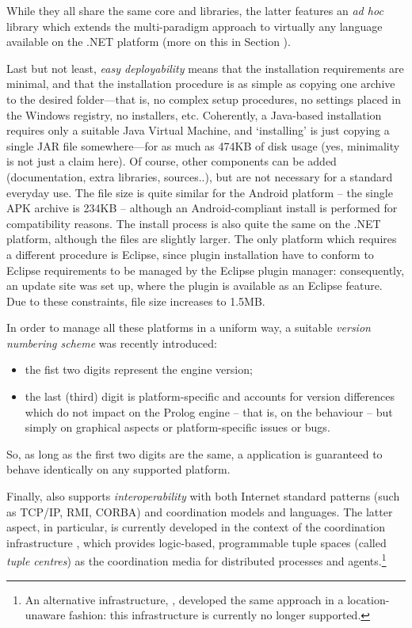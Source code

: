 While they all share the same core and libraries, the latter features an \emph{ad hoc} library which extends the multi-paradigm approach to virtually any language available on the .NET platform (more on this in Section ).

Last but not least, \textit{easy deployability} means that the installation requirements are minimal, and that the installation procedure is as simple as copying one archive to the desired folder---that is, no complex setup procedures, no settings placed in the Windows registry, no installers, etc.
%
Coherently, a Java-based installation requires only a suitable Java Virtual Machine, and `installing' is just copying a single JAR file somewhere---for as much as 474KB of disk usage (yes, minimality is not just a claim here).
%
Of course, other components can be added (documentation, extra libraries, sources..), but are not necessary for a standard everyday use.
%
The file size is quite similar for the Android platform -- the single APK archive is 234KB -- although an Android-compliant install is performed for compatibility reasons.
%
The install process is also quite the same on the .NET platform, although the files are slightly larger.
%
The only platform which requires a different procedure is Eclipse, since plugin installation have to conform to Eclipse requirements to be managed by the Eclipse plugin manager: consequently, an update site was set up, where the \tuprolog{} plugin is available as an Eclipse feature. Due to these constraints, file size increases to 1.5MB.

In order to manage all these platforms in a uniform way, a suitable \emph{version numbering scheme} was recently introduced:
\begin{itemize}
  \item the fist two digits represent the engine version;
  \item the last (third) digit is platform-specific and accounts for version differences which do not impact on the Prolog engine -- that is, on the
      \tuprolog{} behaviour -- but simply on graphical aspects or platform-specific
      issues or bugs.
\end{itemize}
%
So, as long as the first two digits are the same, a \tuprolog{} application is guaranteed to behave identically on any supported platform.


Finally, \tuprolog{} also supports \textit{interoperability} with both Internet standard patterns (such as TCP/IP, RMI, CORBA) and coordination models and languages.
%
The latter aspect, in particular, is currently developed in the context of the \tucson{} coordination infrastructure \cite{tucson-aamas99,respect-scico2001}, which provides logic-based, programmable tuple spaces (called \emph{tuple centres}) as the coordination media for distributed processes and agents.\footnote{An alternative infrastructure, \luce{} \cite{luce-aamas2001}, developed the same approach in a location-unaware fashion: this infrastructure is currently no longer supported.}


